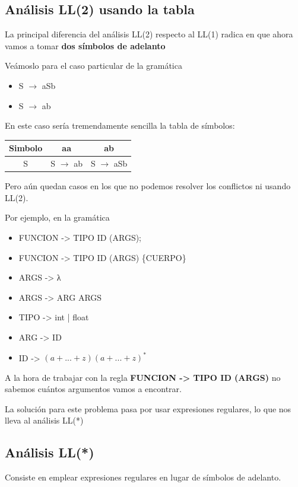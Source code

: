\documentclass{apuntes}
\begin{document}
\subsection{Análisis LL(2) usando la tabla}
La principal diferencia del análisis LL(2) respecto al LL(1) radica en que ahora vamos a tomar \textbf{dos símbolos de adelanto}

Veámoslo para el caso particular de la gramática
\begin{itemize}
\item S $\rightarrow$ aSb
\item S $\rightarrow$ ab
\end{itemize}

En este caso sería tremendamente sencilla la tabla de símbolos:
\begin{center}
\begin{tabular}{| c | c | c |}
\hline
Simbolo & aa & ab \\
\hline
S &  S $\rightarrow$ ab &  S $\rightarrow$ aSb \\
\hline
\end{tabular}
\end{center}


Pero aún quedan casos en los que no podemos resolver los conflictos ni usando LL(2).

Por ejemplo, en la gramática
\begin{itemize}
\item FUNCION -> TIPO ID (ARGS);
\item FUNCION -> TIPO ID (ARGS) \{CUERPO\}
\item ARGS -> λ
\item ARGS -> ARG ARGS
\item TIPO -> int | float
\item ARG -> ID
\item ID -> $(a+...+z)(a+...+z)^*$
\end{itemize}

A la hora de trabajar con la regla \textbf{FUNCION -> TIPO ID (ARGS)} no sabemos cuántos argumentos vamos a encontrar.

La solución para este problema pasa por usar expresiones regulares, lo que nos lleva al análisis LL(*)

\subsection{Análisis LL(*)}
Consiste en emplear expresiones regulares en lugar de símbolos de adelanto.
\end{document}
